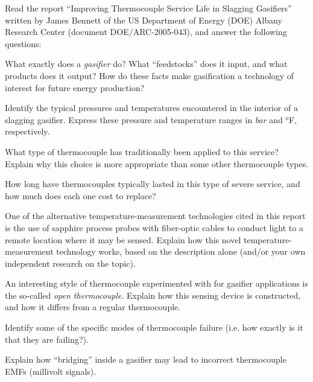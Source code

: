 

Read the report ``Improving Thermocouple Service Life in Slagging Gasifiers'' written by James Bennett of the US Department of Energy (DOE) Albany Research Center (document DOE/ARC-2005-043), and answer the following questions:

\vskip 10pt

What exactly does a {\it gasifier} do?  What ``feedstocks'' does it input, and what products does it output?  How do these facts make gasification a technology of interest for future energy production?

\vskip 10pt

Identify the typical pressures and temperatures encountered in the interior of a slagging gasifier.  Express these pressure and temperature ranges in {\it bar} and $^{o}$F, respectively.

\vskip 10pt

What type of thermocouple has traditionally been applied to this service?  Explain why this choice is more appropriate than some other thermocouple types.

\vskip 10pt

How long have thermocouples typically lasted in this type of severe service, and how much does each one cost to replace?

\vskip 10pt

One of the alternative temperature-measurement technologies cited in this report is the use of sapphire process probes with fiber-optic cables to conduct light to a remote location where it may be sensed.  Explain how this novel temperature-measurement technology works, based on the description alone (and/or your own independent research on the topic).

\vskip 10pt

An interesting style of thermocouple experimented with for gasifier applications is the so-called {\it open thermocouple}.  Explain how this sensing device is constructed, and how it differs from a regular thermocouple.

\vskip 10pt

Identify some of the specific modes of thermocouple failure (i.e. how exactly is it that they are failing?).

\vskip 10pt

Explain how ``bridging'' inside a gasifier may lead to incorrect thermocouple EMFs (millivolt signals).

